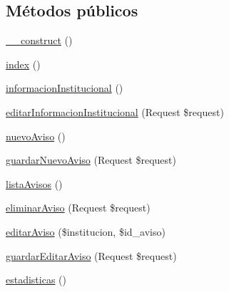 \subsection*{\-Métodos públicos}
\begin{DoxyCompactItemize}
\item 
\hyperlink{class_app_1_1_http_1_1_controllers_1_1_home_controller_a095c5d389db211932136b53f25f39685}{\-\_\-\-\_\-construct} ()
\item 
\hyperlink{class_app_1_1_http_1_1_controllers_1_1_home_controller_a149eb92716c1084a935e04a8d95f7347}{index} ()
\item 
\hyperlink{class_app_1_1_http_1_1_controllers_1_1_home_controller_a2b9266e19e6e9224aaae7b4c7836ff40}{informacion\-Institucional} ()
\item 
\hyperlink{class_app_1_1_http_1_1_controllers_1_1_home_controller_adb42f8dc18c16f7d581c3615a03d6f75}{editar\-Informacion\-Institucional} (\-Request \$request)
\item 
\hyperlink{class_app_1_1_http_1_1_controllers_1_1_home_controller_ad1992463a8d72baca9db54556e0ada5a}{nuevo\-Aviso} ()
\item 
\hyperlink{class_app_1_1_http_1_1_controllers_1_1_home_controller_aa8267c0b6eb2bb4b99276eee892b81cd}{guardar\-Nuevo\-Aviso} (\-Request \$request)
\item 
\hyperlink{class_app_1_1_http_1_1_controllers_1_1_home_controller_a599f5b2f09e9ab0cba15ac2e08e2d3a4}{lista\-Avisos} ()
\item 
\hyperlink{class_app_1_1_http_1_1_controllers_1_1_home_controller_a75d08b7be79fbf0f19475105c86543fc}{eliminar\-Aviso} (\-Request \$request)
\item 
\hyperlink{class_app_1_1_http_1_1_controllers_1_1_home_controller_a8dc2e6cb03dec9b57efd17e5c0b44bf5}{editar\-Aviso} (\$institucion, \$id\-\_\-aviso)
\item 
\hyperlink{class_app_1_1_http_1_1_controllers_1_1_home_controller_a7a9cc6d3be72174f7e315185572208ac}{guardar\-Editar\-Aviso} (\-Request \$request)
\item 
\hyperlink{class_app_1_1_http_1_1_controllers_1_1_home_controller_a2c26c9b748066e4f390ee5172daa72b2}{estadisticas} ()
\end{DoxyCompactItemize}


